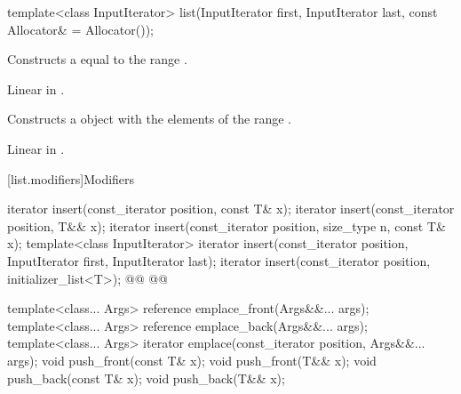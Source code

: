 \documentclass{wg21}
\begin{document}
%
\begin{itemdecl}
    template<class InputIterator>
    list(InputIterator first, InputIterator last, const Allocator& = Allocator());
\end{itemdecl}

\begin{itemdescr}
    \pnum
    \effects
    Constructs a
    equal to the range
    .
    
    \pnum
    \complexity
    Linear in
    .
\end{itemdescr}

\begin{addedblock}
\begin{itemdecl}
template<@@ R>}
list(from_range_t, R&& range, const Allocator& = Allocator());
\end{itemdecl}

\begin{itemdescr}
    \pnum
    \effects
    Constructs a  object with the elements of the range .
    
    \pnum
    \complexity
    Linear in .
\end{itemdescr}
\end{addedblock}

[list.modifiers]{Modifiers}

%
\begin{itemdecl}
    iterator insert(const_iterator position, const T& x);
    iterator insert(const_iterator position, T&& x);
    iterator insert(const_iterator position, size_type n, const T& x);
    template<class InputIterator>
    iterator insert(const_iterator position, InputIterator first,
    InputIterator last);
    iterator insert(const_iterator position, initializer_list<T>);
    @@
    @@
    
    template<class... Args> reference emplace_front(Args&&... args);
    template<class... Args> reference emplace_back(Args&&... args);
    template<class... Args> iterator emplace(const_iterator position, Args&&... args);
    void push_front(const T& x);
    void push_front(T&& x);
    void push_back(const T& x);
    void push_back(T&& x);
\end{itemdecl}
\end{document}

